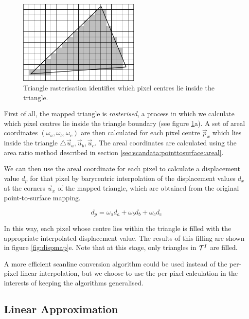 \begin{figure}
\begin{center}
\includegraphics[width=6cm]{../images/raster}
\caption[Triangle Rasterisation]{\label{fig:raster} Triangle rasterisation identifies which pixel centres lie inside the triangle.}
\end{center}
\end{figure}

First of all, the mapped triangle is {\it rasterised}, a process in which we calculate which pixel centres lie inside the triangle boundary (see figure \ref{fig:raster}a). A set of areal coordinates $(\omega_a ,\omega_b ,\omega_c)$ are then calculated for each pixel centre $\vec{p}_x$ which lies inside the triangle $\triangle{\vec{u}_a,\vec{u}_b,\vec{u}_c}$. The areal coordinates are calculated using the area ratio method described in section \ref{sec:scandata:pointtosurface:areal}.

We can then use the areal coordinate for each pixel to calculate a displacement value $d_p$ for that pixel by barycentric interpolation of the displacement values $d_x$ at the corners $\vec{u}_x$ of the mapped triangle, which are obtained from the original point-to-surface mapping. 

\begin{equation} \label{eqn:pixeldisp}
d_p = \omega_a d_a + \omega_b d_b + \omega_c d_c
\end{equation}

In this way, each pixel whose centre lies within the triangle is filled with the appropriate interpolated displacement value. The results of this filling are shown in figure \ref{fig:dispmap}e. Note that at this stage, only triangles in ${\cal T}^I$ are filled.

A more efficient scanline conversion algorithm could be used instead of the per-pixel linear interpolation, but we choose to use the per-pixel calculation in the interests of keeping the algorithms generalised.

\subsection{\label{sec:dispmapcreation:triangles:approx}Linear Approximation}

